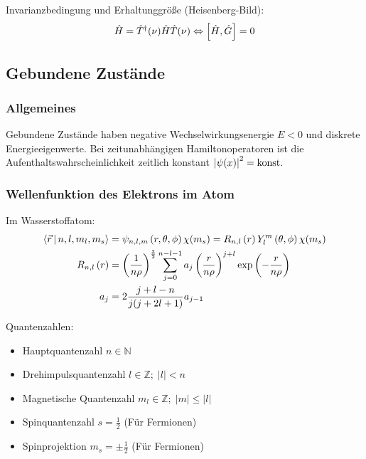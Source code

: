 \documentclass[11pt]{article}
\numberwithin{equation}{section}
\begin{document}
				\noindent
				Invarianzbedingung und Erhaltunggröße (Heisenberg-Bild):
				\begin{equation}
					\hat{H} =\hat{T}^\dagger(\nu)\hat{H} \hat{T}(\nu) \Leftrightarrow \left[\hat{H},\hat{G}\right] = 0
				\end{equation}

		\subsection{Gebundene Zustände}
			\subsubsection{Allgemeines}
				\noindent
				Gebundene Zustände haben negative Wechselwirkungsenergie $E<0$ und diskrete Energieeigenwerte. Bei zeitunabhängigen Hamiltonoperatoren ist die Aufenthaltswahrscheinlichkeit zeitlich konstant $\left|\psi(x)\right|^2=\mathrm{konst.}$

			\subsubsection{Wellenfunktion des Elektrons im Atom}
				\noindent
				Im Wasserstoffatom:
				\begin{equation}
					\begin{aligned}
						\Braket{\vec{r}|n,l,m_l,m_s} &= \psi_{n,l,m}\left(r,\theta,\phi\right)\chi(m_s)
						= R_{n,l}\left(r\right) Y_l^m\left(\theta,\phi\right)\chi(m_s) \\
						R_{n,l}\left(r\right)
						&= \left(\frac{1}{n\rho}\right)^{\frac{3}{2}}
						\sum_{j=0}^{n-l-1} a_j \left(\frac{r}{n\rho}\right)^{j+l} \exp\left({-\frac{r}{n\rho}}\right) \\
						a_j &= 2\frac{j+l-n}{j(j+2l+1)} a_{j-1} \\
					\end{aligned}
				\end{equation}

				\noindent
				Quantenzahlen:
				\begin{itemize}
					\item Hauptquantenzahl $n \in \mathbb{N}$
					\item Drehimpulsquantenzahl $l \in \mathbb{Z};\; \left|l\right| < n$
					\item Magnetische Quantenzahl $m_l \in \mathbb{Z};\; \left|m\right| \le \left|l\right|$
					\item Spinquantenzahl $s = \frac{1}{2}$ (Für Fermionen)
					\item Spinprojektion $m_s = \pm \frac{1}{2}$ (Für Fermionen)
				\end{itemize}
\end{document}
